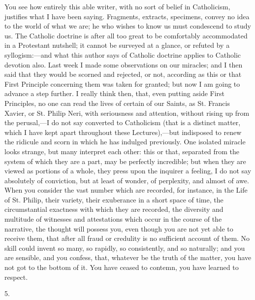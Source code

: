 You see how entirely this able writer, with no sort of
belief in Catholicism, justifies what I have been saying.
Fragments, extracts, specimens, convey no idea to the
world of what we are; he who wishes to know us must
condescend to study us. The Catholic doctrine is after
all too great to be comfortably accommodated in a
Protestant nutshell; it cannot be surveyed at a glance,
or refuted by a syllogism:—and what this author says of
Catholic doctrine applies to Catholic devotion also. Last
week I made some observations on our miracles; and I then
said that they would be scorned and rejected, or not,
according as this or that First Principle concerning them
was taken for granted; but now I am going to advance a
step further. I really think then, that, even putting
aside First Principles, no one can read the lives of
certain of our Saints, as St. Francis Xavier, or St.
Philip Neri, with seriousness and attention, without
rising up from the perusal,—I do not say converted to
Catholicism (that is a distinct matter, which I have kept
apart throughout these Lectures),—but indisposed to
renew the ridicule and scorn in which he has indulged
previously. One isolated miracle looks strange, but many
interpret each other: this or that, separated from the
system of which they are a part, may be perfectly
incredible; but when they are viewed as portions of a
whole, they press upon the inquirer a feeling, I do not
say absolutely of conviction, but at least of wonder, of
perplexity, and almost of awe. When you consider the vast
number which are recorded, for instance, in the Life of
St. Philip, their variety, their exuberance in a short
space of time, the circumstantial exactness with which
they are recorded, the diversity and multitude of
witnesses and attestations which occur in the course of
the narrative, the thought will possess you, even though
you are not yet able to receive them, that after all
fraud or credulity is no sufficient account of them. No
skill could invent so many, so rapidly, so consistently,
and so naturally; and you are sensible, and you confess,
that, whatever be the truth of the matter, you have not
got to the bottom of it. You have ceased to contemn, you
have learned to respect.

5.

